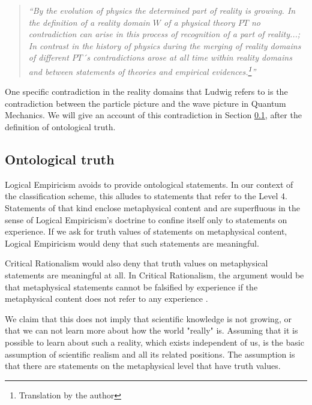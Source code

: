 \documentclass{article}
\begin{document}
\begin{quote}
\textit{``By the evolution of physics the determined part of reality is growing. In the definition of a reality domain $W$ of a physical theory $PT$ no contradiction can arise in this process of recognition of a part of reality...; In contrast in the history of physics during the merging of reality domains of different $PT$´s  contradictions arose at all time within reality domains and between statements of theories and empirical evidences.\footnote{Translation by the author}''}
\end{quote}

One specific contradiction in the reality domains that Ludwig refers to is the contradiction between the particle picture and the wave picture in Quantum Mechanics. We will give an account of this contradiction in Section \ref{Section Ontological truth}, after the definition of ontological truth.

\newpage

\subsection{Ontological truth}
\label{Section Ontological truth}

Logical Empiricism avoids to provide ontological statements. In our context of the classification scheme, this alludes to statements that refer to the Level 4. Statements of that kind enclose metaphysical content and are superfluous in the sense of Logical Empiricism's doctrine to confine itself only to statements on experience. If we ask for truth values of statements on metaphysical content, Logical Empiricism would deny that such statements are meaningful. \newline

Critical Rationalism would also deny that truth values on metaphysical statements are meaningful at all. In Critical Rationalism, the argument would be that metaphysical statements cannot be falsified by experience if the metaphysical content does not refer to any experience \cite[]{popper2005logic}. \newline

We claim that this does not imply that scientific knowledge is not growing, or that we can not learn more about how the world "really" is. Assuming that it is possible to learn about such a reality, which exists independent of us, is the basic assumption of scientific realism and all its related positions. The assumption is that there are statements on the metaphysical level that have truth values. \newline
\end{document}
